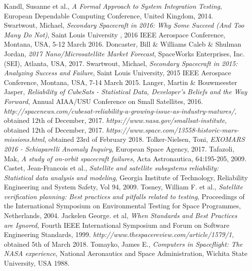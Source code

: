 \documentclass[english,12pt,a4paper,pdftex,elec,utf8]{aaltothesis}
\begin{document}
\begin{thebibliography}{99}
 Kandl, Susanne et al.,
  \textit{A Formal Approach to System Integration Testing}, European Dependable Computing Conference, United Kingdom, 2014.  
 Swartwout, Michael,
  \textit{Secondary Spacecraft in 2016: Why Some Succeed (And Too Many Do Not)}, Saint Louis University , 2016 IEEE Aerospace Conference, Montana, USA,  5-12 March 2016. 
 Doncaster, Bill \& Williams Caleb \& Shulman Jordan,
  \textit{2017 Nano/Microsatellite Market Forecast}, SpaceWorks Enterprises, Inc. (SEI), Atlanta, USA, 2017.
 Swartwout, Michael,
  \textit{Secondary Spacecraft in 2015: Analyzing Success and Failure}, Saint Louis University, 2015 IEEE Aerospace Conference, Montana, USA, 7-14 March 2015. 
 Langer, Martin \& Bouwmeester Jasper,
  \textit{Reliability of CubeSats - Statistical Data, Developer's Beliefs and the Way Forward},  Annual AIAA/USU Conference on Small Satellites, 2016.
  \textit{http://spacenews.com/cubesat-reliability-a-growing-issue-as-industry-matures/}, obtained 12th of December, 2017.  
  \textit{https://www.nasa.gov/smallsat-institute}, obtained 12th of December, 2017. 
  \textit{https://www.space.com/13558-historic-mars-missions.html}, obtained 23rd of February 2018.
 Tolker-Nielsen, Toni,
  \textit{EXOMARS 2016 - Schiaparelli Anomaly Inquiry}, European Space Agency, 2017.
 Tafazoli, Mak,
  \textit{A study of on-orbit spacecraft failures}, Acta Astronautica, 64:195-205, 2009.
 Castet, Jean-Francois et al.,
  \textit{Satellite and satellite subsystems reliability: Statistical data analysis
and modeling}, Georgia Institute of Technology, Reliability Engineering and System Safety, Vol 94, 2009.
 Tosney, William F. et al.,
  \textit{Satellite verification planning: Best practices and pitfalls related to testing}, Proceedings of the  International Symposium on Environmental Testing for Space Programmes, Netherlands, 2004.
 Jackelen George. et al,
  \textit{When Standards and Best Practices are Ignored}, Fourth IEEE International Symposium and Forum on Software Engineering Standards, 1999.
  \textit{http://www.thespacereview.com/article/1579/1}, obtained 5th of March 2018.
 Tomayko, James E.,
  \textit{Computers in Spaceflight: The NASA experience}, National Aeronautics and Space Administration, Wichita State University, USA 1988.

\end{thebibliography}
\end{document}
